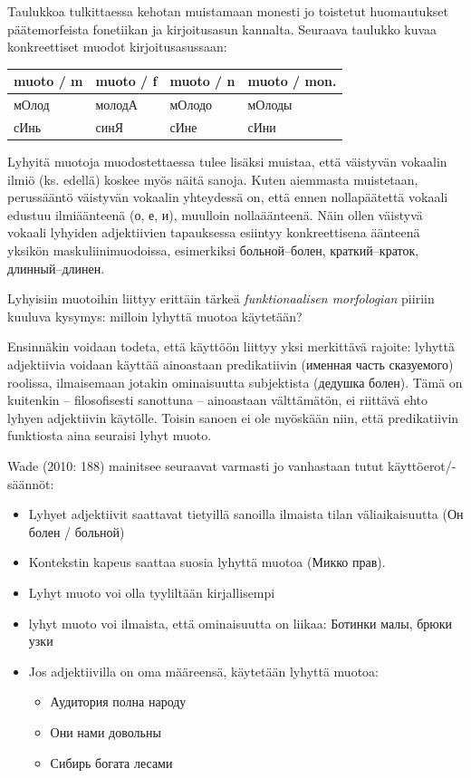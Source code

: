\documentclass[]{scrreprt}
\providecommand{\tightlist}{%
  \setlength{\itemsep}{0pt}\setlength{\parskip}{0pt}}
\begin{document}
Taulukkoa tulkittaessa kehotan muistamaan monesti jo toistetut
huomautukset päätemorfeista fonetiikan ja kirjoitusasun kannalta.
Seuraava taulukko kuvaa konkreettiset muodot kirjoitusasussaan:

\begin{longtable}[c]{@{}llll@{}}
\toprule
muoto / m & muoto / f & muoto / n & muoto / mon.\tabularnewline
\midrule
\endhead
мОлод & молодА & мОлодо & мОлоды\tabularnewline
сИнь & синЯ & сИне & сИни\tabularnewline
\bottomrule
\end{longtable}

Lyhyitä muotoja muodostettaessa tulee lisäksi muistaa, että väistyvän
vokaalin ilmiö (ks. edellä) koskee myös näitä sanoja. Kuten aiemmasta
muistetaan, perussääntö väistyvän vokaalin yhteydessä on, että ennen
nollapäätettä vokaali edustuu ilmiäänteenä (о, е, и), muulloin
nollaäänteenä. Näin ollen väistyvä vokaali lyhyiden adjektiivien
tapauksessa esiintyy konkreettisena äänteenä yksikön
maskuliinimuodoissa, esimerkiksi больной--болен, краткий--краток,
длинный--длинен.

Lyhyisiin muotoihin liittyy erittäin tärkeä \emph{funktionaalisen
morfologian} piiriin kuuluva kysymys: milloin lyhyttä muotoa käytetään?

Ensinnäkin voidaan todeta, että käyttöön liittyy yksi merkittävä
rajoite: lyhyttä adjektiivia voidaan käyttää ainoastaan predikatiivin
(именная часть сказуемого) roolissa, ilmaisemaan jotakin ominaisuutta
subjektista (дедушка болен). Tämä on kuitenkin -- filosofisesti
sanottuna -- ainoastaan välttämätön, ei riittävä ehto lyhyen adjektiivin
käytölle. Toisin sanoen ei ole myöskään niin, että predikatiivin
funktiosta aina seuraisi lyhyt muoto.

Wade (2010: 188) mainitsee seuraavat varmasti jo vanhastaan tutut
käyttöerot/-säännöt:

\begin{itemize}
\tightlist
\item
  Lyhyet adjektiivit saattavat tietyillä sanoilla ilmaista tilan
  väliaikaisuutta (Он болен / больной)
\item
  Kontekstin kapeus saattaa suosia lyhyttä muotoa (Микко прав).
\item
  Lyhyt muoto voi olla tyyliltään kirjallisempi
\item
  lyhyt muoto voi ilmaista, että ominaisuutta on liikaa: Ботинки малы,
  брюки узки
\item
  Jos adjektiivilla on oma määreensä, käytetään lyhyttä muotoa:

  \begin{itemize}
  \tightlist
  \item
    Аудитория полна народу
  \item
    Они нами довольны
  \item
    Сибирь богата лесами
  \end{itemize}
\end{itemize}
\end{document}
